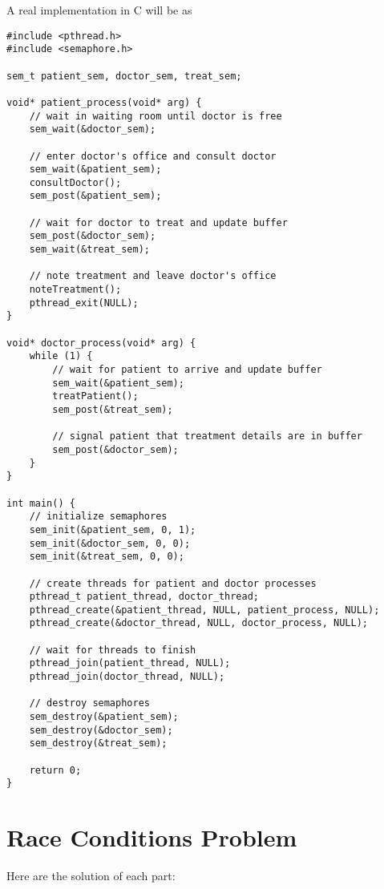 \documentclass{article}
\begin{document}
A real implementation in C will be as
\begin{lstlisting}[style=cstyle]
#include <pthread.h>
#include <semaphore.h>

sem_t patient_sem, doctor_sem, treat_sem;

void* patient_process(void* arg) {
    // wait in waiting room until doctor is free
    sem_wait(&doctor_sem);

    // enter doctor's office and consult doctor
    sem_wait(&patient_sem);
    consultDoctor();
    sem_post(&patient_sem);

    // wait for doctor to treat and update buffer
    sem_post(&doctor_sem);
    sem_wait(&treat_sem);

    // note treatment and leave doctor's office
    noteTreatment();
    pthread_exit(NULL);
}

void* doctor_process(void* arg) {
    while (1) {
        // wait for patient to arrive and update buffer
        sem_wait(&patient_sem);
        treatPatient();
        sem_post(&treat_sem);

        // signal patient that treatment details are in buffer
        sem_post(&doctor_sem);
    }
}

int main() {
    // initialize semaphores
    sem_init(&patient_sem, 0, 1);
    sem_init(&doctor_sem, 0, 0);
    sem_init(&treat_sem, 0, 0);

    // create threads for patient and doctor processes
    pthread_t patient_thread, doctor_thread;
    pthread_create(&patient_thread, NULL, patient_process, NULL);
    pthread_create(&doctor_thread, NULL, doctor_process, NULL);

    // wait for threads to finish
    pthread_join(patient_thread, NULL);
    pthread_join(doctor_thread, NULL);

    // destroy semaphores
    sem_destroy(&patient_sem);
    sem_destroy(&doctor_sem);
    sem_destroy(&treat_sem);

    return 0;
}
\end{lstlisting}

\pagebreak

\section{Race Conditions Problem}%
Here are the solution of each part:
\end{document}
